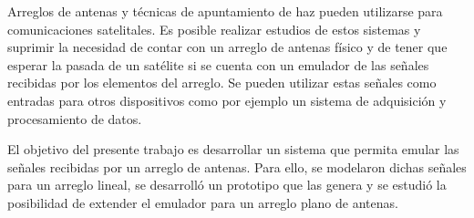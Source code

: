 \documentclass[class=article, crop=false]{standalone}
\begin{document}
Arreglos de antenas y técnicas de apuntamiento de haz pueden utilizarse para comunicaciones satelitales.
Es posible realizar estudios de estos sistemas y suprimir la necesidad de contar con un arreglo de antenas físico y de tener que esperar la pasada de un satélite si se cuenta con un emulador de las señales recibidas por los elementos del arreglo.
Se pueden utilizar estas señales como entradas para otros dispositivos como por ejemplo un sistema de adquisición y procesamiento de datos.

El objetivo del presente trabajo es desarrollar un sistema que permita emular las señales recibidas por un arreglo de antenas.
Para ello, se modelaron dichas señales para un arreglo lineal, se desarrolló un prototipo que las genera y se estudió la posibilidad de extender el emulador para un arreglo plano de antenas.
\end{document}
